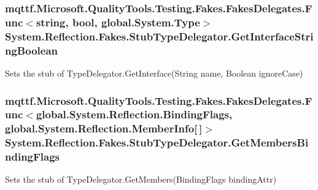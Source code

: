 \hypertarget{class_system_1_1_reflection_1_1_fakes_1_1_stub_type_delegator_a4b055a1b66e7cc6c92b1cd3b7c760dec}{
\subsubsection[{Get\-Interface\-String\-Boolean}]{\setlength{\rightskip}{0pt plus 5cm}mqttf.\-Microsoft.\-Quality\-Tools.\-Testing.\-Fakes.\-Fakes\-Delegates.\-Func$<$string, bool, global.\-System.\-Type$>$ System.\-Reflection.\-Fakes.\-Stub\-Type\-Delegator.\-Get\-Interface\-String\-Boolean}}\label{class_system_1_1_reflection_1_1_fakes_1_1_stub_type_delegator_a4b055a1b66e7cc6c92b1cd3b7c760dec}


Sets the stub of Type\-Delegator.\-Get\-Interface(\-String name, Boolean ignore\-Case)

\hypertarget{class_system_1_1_reflection_1_1_fakes_1_1_stub_type_delegator_a7720980b43e3889914c4eaeeb0dd0f7f}{
\subsubsection[{Get\-Members\-Binding\-Flags}]{\setlength{\rightskip}{0pt plus 5cm}mqttf.\-Microsoft.\-Quality\-Tools.\-Testing.\-Fakes.\-Fakes\-Delegates.\-Func$<$global.\-System.\-Reflection.\-Binding\-Flags, global.\-System.\-Reflection.\-Member\-Info\mbox{[}$\,$\mbox{]}$>$ System.\-Reflection.\-Fakes.\-Stub\-Type\-Delegator.\-Get\-Members\-Binding\-Flags}}\label{class_system_1_1_reflection_1_1_fakes_1_1_stub_type_delegator_a7720980b43e3889914c4eaeeb0dd0f7f}


Sets the stub of Type\-Delegator.\-Get\-Members(\-Binding\-Flags binding\-Attr)

